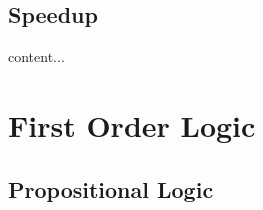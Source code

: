 \documentclass[a4paper,oneside]{book}
\begin{document}
\chapter{Speedup}
\begin{definition}
content...
\end{definition}
\newpage























\part{First Order Logic}
\chapter{Propositional Logic}
\end{document}

